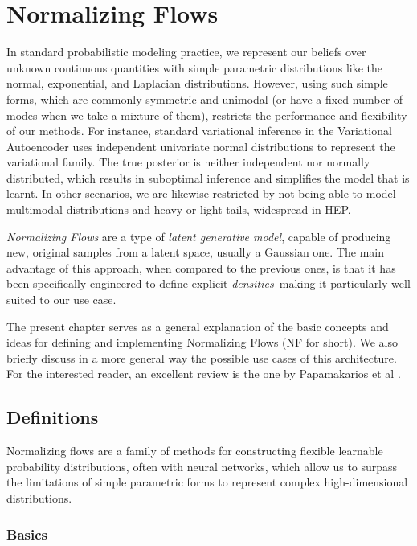 \chapter{Normalizing Flows}\label{ch:mathtest} %

In standard probabilistic modeling practice, we represent our beliefs over unknown continuous quantities with simple parametric distributions like the normal, exponential, and Laplacian distributions. However, using such simple forms, which are commonly symmetric and unimodal (or have a fixed number of modes when we take a mixture of them), restricts the performance and flexibility of our methods. For instance, standard variational inference in the Variational Autoencoder uses independent univariate normal distributions to represent the variational family. The true posterior is neither independent nor normally distributed, which results in suboptimal inference and simplifies the model that is learnt. In other scenarios, we are likewise restricted by not being able to model multimodal distributions and heavy or light tails, widespread in HEP.

\emph{Normalizing Flows} are a type of \emph{latent generative model}, capable of producing new, original samples from a latent space, usually a Gaussian one. The main advantage of this approach, when compared to the previous ones, is that it has been specifically engineered to define explicit \emph{densities}--making it particularly well suited to our use case.

The present chapter serves as a general explanation of the basic concepts and ideas for defining and implementing Normalizing Flows (NF for short). We also briefly discuss in a more general way the possible use cases of this architecture. For the interested reader, an excellent review is the one by Papamakarios et al \cite{papanf}.

\section{Definitions}

Normalizing flows are a family of methods for constructing flexible learnable probability distributions, often with neural networks, which allow us to surpass the limitations of simple parametric forms to represent complex high-dimensional distributions.

\subsection{Basics}

